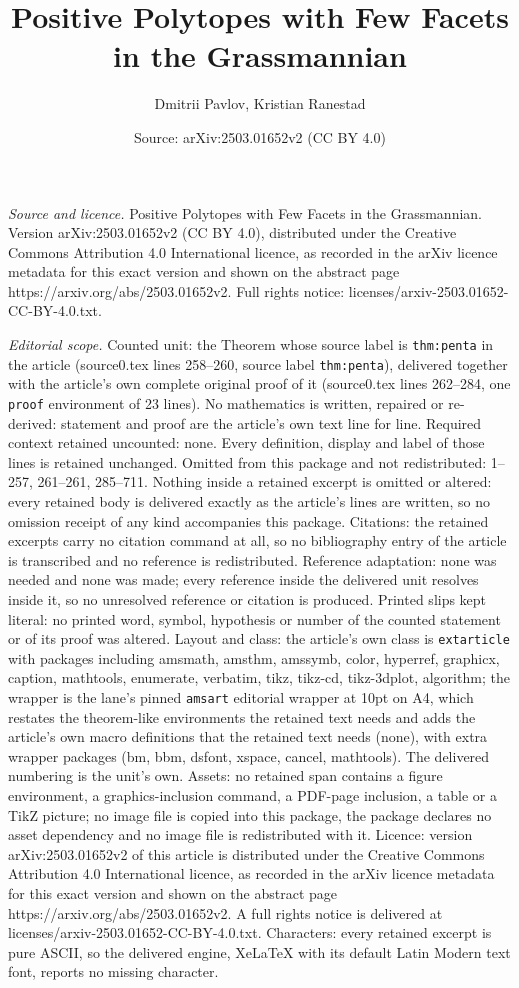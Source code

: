 \documentclass[10pt,a4paper]{amsart}
\title[Positive Polytopes with Few Facets in the Grassmannian]{Positive Polytopes with Few Facets in the Grassmannian}
\author{Dmitrii Pavlov, Kristian Ranestad}
\date{Source: arXiv:2503.01652v2 (CC BY 4.0)}
\begin{document}
\maketitle

\noindent\emph{Source and licence.} Positive Polytopes with Few Facets in the Grassmannian. Version arXiv:2503.01652v2 (CC BY 4.0), distributed under the Creative Commons Attribution 4.0 International licence, as recorded in the arXiv licence metadata for this exact version and shown on the abstract page https://arxiv.org/abs/2503.01652v2. Full rights notice: licenses/arxiv-2503.01652-CC-BY-4.0.txt.\par\smallskip

\noindent\textit{Editorial scope.} Counted unit: the Theorem whose source label is \texttt{thm:penta} in the article (source0.tex lines 258--260, source label \texttt{thm:penta}), delivered together with the article's own complete original proof of it (source0.tex lines 262--284, one \texttt{proof} environment of 23 lines). No mathematics is written, repaired or re-derived: statement and proof are the article's own text line for line. Required context retained uncounted: none. Every definition, display and label of those lines is retained unchanged. Omitted from this package and not redistributed: 1--257, 261--261, 285--711. Nothing inside a retained excerpt is omitted or altered: every retained body is delivered exactly as the article's lines are written, so no omission receipt of any kind accompanies this package. Citations: the retained excerpts carry no citation command at all, so no bibliography entry of the article is transcribed and no reference is redistributed. Reference adaptation: none was needed and none was made; every reference inside the delivered unit resolves inside it, so no unresolved reference or citation is produced. Printed slips kept literal: no printed word, symbol, hypothesis or number of the counted statement or of its proof was altered. Layout and class: the article's own class is \texttt{extarticle} with packages including amsmath, amsthm, amssymb, color, hyperref, graphicx, caption, mathtools, enumerate, verbatim, tikz, tikz-cd, tikz-3dplot, algorithm; the wrapper is the lane's pinned \texttt{amsart} editorial wrapper at 10pt on A4, which restates the theorem-like environments the retained text needs and adds the article's own macro definitions that the retained text needs (none), with extra wrapper packages (bm, bbm, dsfont, xspace, cancel, mathtools). The delivered numbering is the unit's own. Assets: no retained span contains a figure environment, a graphics-inclusion command, a PDF-page inclusion, a table or a TikZ picture; no image file is copied into this package, the package declares no asset dependency and no image file is redistributed with it. Licence: version arXiv:2503.01652v2 of this article is distributed under the Creative Commons Attribution 4.0 International licence, as recorded in the arXiv licence metadata for this exact version and shown on the abstract page https://arxiv.org/abs/2503.01652v2. A full rights notice is delivered at licenses/arxiv-2503.01652-CC-BY-4.0.txt. Characters: every retained excerpt is pure ASCII, so the delivered engine, XeLaTeX with its default Latin Modern text font, reports no missing character.
\end{document}
